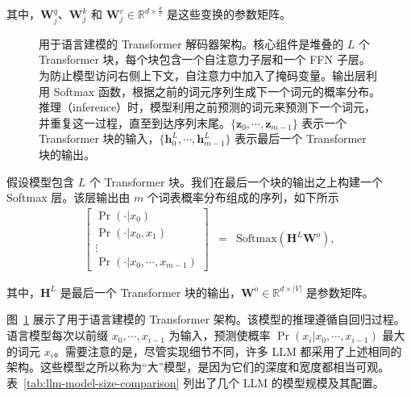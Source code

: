 \noindent 其中，$\mathbf{W}_j^{q}$、$\mathbf{W}_j^{k}$ 和 $\mathbf{W}_j^{v} \in \mathbb{R}^{d \times \frac{d}{\tau}}$ 是这些变换的参数矩阵。

\begin{figure}[!t]
\centering

\caption{用于语言建模的 Transformer 解码器架构。核心组件是堆叠的 $L$ 个 Transformer 块，每个块包含一个自注意力子层和一个 FFN 子层。为防止模型访问右侧上下文，自注意力中加入了掩码变量。输出层利用 Softmax 函数，根据之前的词元序列生成下一个词元的概率分布。推理（inference）时，模型利用之前预测的词元来预测下一个词元，并重复这一过程，直至到达序列末尾。$\{\mathbf{z}_0,\cdots,\mathbf{z}_{m-1}\}$ 表示一个 Transformer 块的输入，$\{\mathbf{h}_0^{L},\cdots,\mathbf{h}_{m-1}^{L}\}$ 表示最后一个 Transformer 块的输出。}
\label{fig:llm-transformer-decoder}
\end{figure}

假设模型包含 $L$ 个 Transformer 块。我们在最后一个块的输出之上构建一个 Softmax 层。该层输出由 $m$ 个词表概率分布组成的序列，如下所示
\begin{eqnarray}
\begin{bmatrix}
\Pr(\cdot | x_0) \\
\Pr(\cdot | x_0,x_{1}) \\
\vdots \\
\Pr(\cdot | x_0,\cdots,x_{m-1})
\end{bmatrix}
& = & \mathrm{Softmax}(\mathbf{H}^{L} \mathbf{W}^{o}),
\end{eqnarray}

\noindent 其中，$\mathbf{H}^{L}$ 是最后一个 Transformer 块的输出，$\mathbf{W}^{o} \in \mathbb{R}^{d \times |V|}$ 是参数矩阵。

图~\ref{fig:llm-transformer-decoder} 展示了用于语言建模的 Transformer 架构。该模型的推理遵循自回归过程。语言模型每次以前缀 $x_0,\cdots,x_{i-1}$ 为输入，预测使概率 $\Pr(x_i|x_0,\cdots,x_{i-1})$ 最大的词元 $x_{i}$。需要注意的是，尽管实现细节不同，许多 LLM 都采用了上述相同的架构。这些模型之所以称为“大”模型，是因为它们的深度和宽度都相当可观。表~\ref{tab:llm-model-size-comparison} 列出了几个 LLM 的模型规模及其配置。

